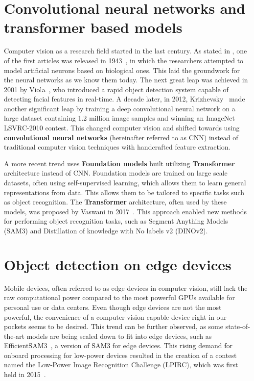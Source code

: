 
\section{Convolutional neural networks and transformer based models}

Computer vision as a research field started in the last century. As stated in \cite{computerVisionNX}, one of the first articles was released in 1943~\cite{mcculloch1943logical}, in which the researchers attempted to model artificial neurons based on biological ones. This laid the groundwork for the neural networks as we know them today. The next great leap was achieved in 2001 by Viola~\cite{viola}, who introduced a rapid object detection system capable of detecting facial features in real-time. A decade later, in 2012, Krizhevsky~\cite{krizhevsky} made another significant leap by training a deep convolutional neural network on a large dataset containing 1.2 million image samples and winning an ImageNet LSVRC-2010 contest. This changed computer vision and shifted towards using \textbf{convolutional neural networks} (hereinafter referred to as CNN) instead of traditional computer vision techniques with handcrafted feature extraction. 

A more recent trend uses \textbf{Foundation models} built utilizing \textbf{Transformer} architecture instead of CNN. Foundation models are trained on large scale datasets, often using self-supervised learning, which allows them to learn general representations from data. This allows them to be tailored to specific tasks such as object recognition. The \textbf{Transformer} architecture, often used by these models, was proposed by Vaswani in 2017~\cite{vaswani2017attention}. This approach enabled new methods for performing object recognition tasks, such as Segment Anything Models (SAM3) and Distillation of knowledge with No labels v2 (DINOv2).



\section{Object detection on edge devices}
Mobile devices, often referred to as edge devices in computer vision, still lack the raw computational power compared to the most powerful GPUs available for personal use or data centers. Even though edge devices are not the most powerful, the convenience of a computer vision capable device right in our pockets seems to be desired. This trend can be further observed, as some state-of-the-art models are being scaled down to fit into edge devices, such as EfficientSAM3~\cite{zeng2025efficientsam3}, a version of SAM3 for edge devices. This rising demand for onboard processing for low-power devices resulted in the creation of a contest named the Low-Power Image Recognition Challenge (LPIRC), which was first held in 2015~\cite{alyamkin2019low}.


